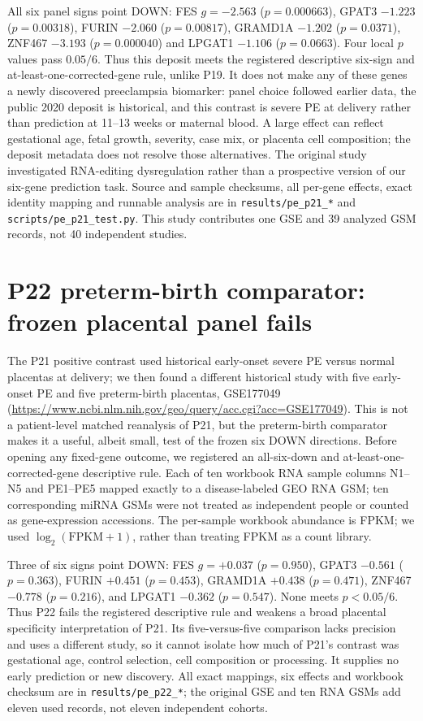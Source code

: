 \documentclass[11pt,a4paper]{article}
\begin{document}
All six panel signs point DOWN: FES $g=-2.563$ ($p=0.000663$), GPAT3 $-1.223$ ($p=0.00318$), FURIN $-2.060$ ($p=0.00817$), GRAMD1A $-1.202$ ($p=0.0371$), ZNF467 $-3.193$ ($p=0.000040$) and LPGAT1 $-1.106$ ($p=0.0663$). Four local $p$ values pass $0.05/6$. Thus this deposit meets the registered descriptive six-sign and at-least-one-corrected-gene rule, unlike P19. It does not make any of these genes a newly discovered preeclampsia biomarker: panel choice followed earlier data, the public 2020 deposit is historical, and this contrast is severe PE at delivery rather than prediction at 11--13 weeks or maternal blood. A large effect can reflect gestational age, fetal growth, severity, case mix, or placenta cell composition; the deposit metadata does not resolve those alternatives. The original study investigated RNA-editing dysregulation rather than a prospective version of our six-gene prediction task. Source and sample checksums, all per-gene effects, exact identity mapping and runnable analysis are in \texttt{results/pe\_p21\_*} and \texttt{scripts/pe\_p21\_test.py}. This study contributes one GSE and 39 analyzed GSM records, not 40 independent studies.

\section{P22 preterm-birth comparator: frozen placental panel fails}
The P21 positive contrast used historical early-onset severe PE versus normal placentas at delivery; we then found a different historical study with five early-onset PE and five preterm-birth placentas, GSE177049 (\url{https://www.ncbi.nlm.nih.gov/geo/query/acc.cgi?acc=GSE177049}). This is not a patient-level matched reanalysis of P21, but the preterm-birth comparator makes it a useful, albeit small, test of the frozen six DOWN directions. Before opening any fixed-gene outcome, we registered an all-six-down and at-least-one-corrected-gene descriptive rule. Each of ten workbook RNA sample columns N1--N5 and PE1--PE5 mapped exactly to a disease-labeled GEO RNA GSM; ten corresponding miRNA GSMs were not treated as independent people or counted as gene-expression accessions. The per-sample workbook abundance is FPKM; we used $\log_2(\mathrm{FPKM}+1)$, rather than treating FPKM as a count library.

Three of six signs point DOWN: FES $g=+0.037$ ($p=0.950$), GPAT3 $-0.561$ ($p=0.363$), FURIN $+0.451$ ($p=0.453$), GRAMD1A $+0.438$ ($p=0.471$), ZNF467 $-0.778$ ($p=0.216$), and LPGAT1 $-0.362$ ($p=0.547$). None meets $p<0.05/6$. Thus P22 fails the registered descriptive rule and weakens a broad placental specificity interpretation of P21. Its five-versus-five comparison lacks precision and uses a different study, so it cannot isolate how much of P21's contrast was gestational age, control selection, cell composition or processing. It supplies no early prediction or new discovery. All exact mappings, six effects and workbook checksum are in \texttt{results/pe\_p22\_*}; the original GSE and ten RNA GSMs add eleven used records, not eleven independent cohorts.
\end{document}
